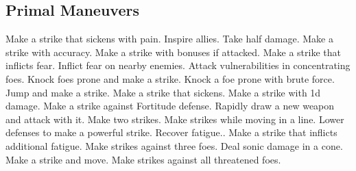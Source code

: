 \subsection{Primal Maneuvers}\label{Primal Maneuvers}
\begin{spelllist}
 Make a strike that sickens with pain.
 Inspire allies.
 Take half damage.
 Make a strike with  accuracy.
 Make a strike with bonuses if attacked.
 Make a strike that inflicts fear.
 Inflict fear on nearby enemies.
 Attack vulnerabilities in concentrating foes.
 Knock foes prone and make a strike.
 Knock a foe prone with brute force.
 Jump and make a strike.
 Make a strike that sickens.
 Make a strike with \plus1d damage.
 Make a strike against Fortitude defense.
 Rapidly draw a new weapon and attack with it.
 Make two strikes.
 Make strikes while moving in a line.
 Lower defenses to make a powerful strike.
 Recover fatigue..
 Make a strike that inflicts additional fatigue.
 Make strikes against three foes.
 Deal sonic damage in a cone.
 Make a strike and move.
 Make strikes against all threatened foes.
\end{spelllist}



\small
